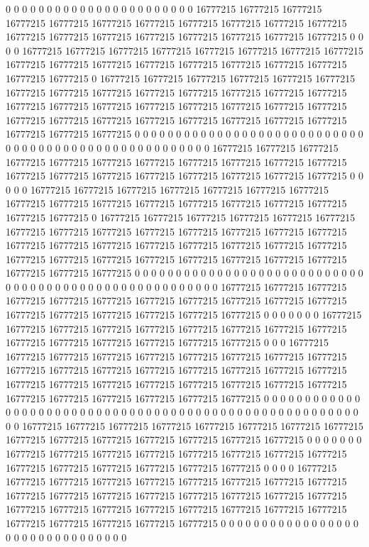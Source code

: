 0 0 0 0 0 0 0 0 0 0 0 0 0 0 0 0 0 0 0 0 0 0 0 16777215 16777215 16777215 16777215 16777215 16777215 16777215 16777215 16777215 16777215 16777215 16777215 16777215 16777215 16777215 16777215 16777215 16777215 16777215 0 0 0 0 16777215 16777215 16777215 16777215 16777215 16777215 16777215 16777215 16777215 16777215 16777215 16777215 16777215 16777215 16777215 16777215 16777215 16777215 0 16777215 16777215 16777215 16777215 16777215 16777215 16777215 16777215 16777215 16777215 16777215 16777215 16777215 16777215 16777215 16777215 16777215 16777215 16777215 16777215 16777215 16777215 16777215 16777215 16777215 16777215 16777215 16777215 16777215 16777215 16777215 16777215 16777215 0 0 0 0 0 0 0 0 0 0 0 0 0 0 0 0 0 0 0 0 0 0 0 0 0 0 0 0 0 0
0 0 0 0 0 0 0 0 0 0 0 0 0 0 0 0 0 0 0 0 0 0 0 16777215 16777215 16777215 16777215 16777215 16777215 16777215 16777215 16777215 16777215 16777215 16777215 16777215 16777215 16777215 16777215 16777215 16777215 16777215 0 0 0 0 0 16777215 16777215 16777215 16777215 16777215 16777215 16777215 16777215 16777215 16777215 16777215 16777215 16777215 16777215 16777215 16777215 16777215 0 16777215 16777215 16777215 16777215 16777215 16777215 16777215 16777215 16777215 16777215 16777215 16777215 16777215 16777215 16777215 16777215 16777215 16777215 16777215 16777215 16777215 16777215 16777215 16777215 16777215 16777215 16777215 16777215 16777215 16777215 16777215 16777215 16777215 0 0 0 0 0 0 0 0 0 0 0 0 0 0 0 0 0 0 0 0 0 0 0 0 0 0 0 0 0 0
0 0 0 0 0 0 0 0 0 0 0 0 0 0 0 0 0 0 0 0 0 0 0 0 16777215 16777215 16777215 16777215 16777215 16777215 16777215 16777215 16777215 16777215 16777215 16777215 16777215 16777215 16777215 16777215 16777215 0 0 0 0 0 0 0 16777215 16777215 16777215 16777215 16777215 16777215 16777215 16777215 16777215 16777215 16777215 16777215 16777215 16777215 16777215 0 0 0 16777215 16777215 16777215 16777215 16777215 16777215 16777215 16777215 16777215 16777215 16777215 16777215 16777215 16777215 16777215 16777215 16777215 16777215 16777215 16777215 16777215 16777215 16777215 16777215 16777215 16777215 16777215 16777215 16777215 16777215 16777215 0 0 0 0 0 0 0 0 0 0 0 0 0 0 0 0 0 0 0 0 0 0 0 0 0 0 0 0 0 0 0
0 0 0 0 0 0 0 0 0 0 0 0 0 0 0 0 0 0 0 0 0 0 0 0 0 0 16777215 16777215 16777215 16777215 16777215 16777215 16777215 16777215 16777215 16777215 16777215 16777215 16777215 16777215 16777215 0 0 0 0 0 0 0 16777215 16777215 16777215 16777215 16777215 16777215 16777215 16777215 16777215 16777215 16777215 16777215 16777215 16777215 0 0 0 0 16777215 16777215 16777215 16777215 16777215 16777215 16777215 16777215 16777215 16777215 16777215 16777215 16777215 16777215 16777215 16777215 16777215 16777215 16777215 16777215 16777215 16777215 16777215 16777215 16777215 16777215 16777215 16777215 16777215 16777215 0 0 0 0 0 0 0 0 0 0 0 0 0 0 0 0 0 0 0 0 0 0 0 0 0 0 0 0 0 0 0 0
